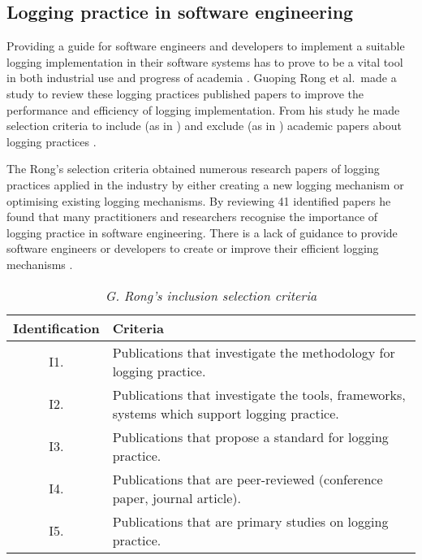 \subsection{Logging practice in software engineering}
Providing a guide for software engineers and developers to implement a suitable logging implementation in their software systems has to prove to be a vital tool in both industrial use and progress of academia \cite{Rong2018a}. Guoping Rong et al.~made a study to review these logging practices published papers to improve the performance and efficiency of logging implementation. From his study he made selection criteria to include (as in ) and exclude (as in ) academic papers about logging practices \cite{Rong2018a,Rong2018}.\par The Rong's selection criteria obtained numerous research papers of logging practices applied in the industry by either creating a new logging mechanism or optimising existing logging mechanisms. By reviewing 41 identified papers he found that many practitioners and researchers recognise the importance of logging practice in software engineering. There is a lack of guidance to provide software engineers or developers to create or improve their efficient logging mechanisms \cite{Rong2018a,Zhu2015}. 

\begin{table}[!htb]
	\centering
	\small
	\caption[G. Rong's inclusion selection criteria]
	{\textit{G. Rong's inclusion selection criteria \cite{Rong2018a}}}
	\label{tbl:CH1_RongIncSelectionCriteria}
	\begin{tabularx}{\textwidth}{|c|X|}
		\hline \textbf{Identification} & \textbf{Criteria} \\
		\hline I1. & Publications that investigate the methodology for logging practice. \\
		\hline I2. & Publications that investigate the tools, frameworks, systems which support logging practice. \\
		\hline I3. & Publications that propose a standard for logging practice.\\
		\hline I4. & Publications that are peer-reviewed (conference paper, journal article). \\
		\hline I5. & Publications that are primary studies on logging practice. \\
		\hline
	\end{tabularx}
\end{table}

